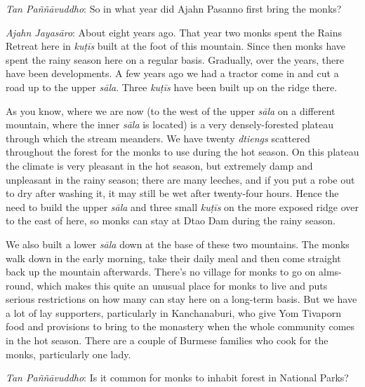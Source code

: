 \emph{Tan Paññāvuddho}: So in what year did Ajahn Pasanno first bring
the monks? 

\emph{Ajahn Jayasāro}: About eight years ago. That year two monks spent
the Rains Retreat here in \emph{kuṭīs} built at the foot of this
mountain. Since then monks have spent the rainy season here on a regular
basis. Gradually, over the years, there have been developments. A few
years ago we had a tractor come in and cut a road up to the upper \emph{sāla}.
Three \emph{kuṭīs} have been built up on the ridge there. 

As you know, where we are now (to the west of the upper \emph{sāla} on a
different mountain, where the inner \emph{sāla} is located) is a very
densely-forested plateau through which the stream meanders. We have
twenty \emph{dtiengs} scattered throughout the forest for the monks to
use during the hot season. On this plateau the climate is very pleasant
in the hot season, but extremely damp and unpleasant in the rainy
season; there are many leeches, and if you put a robe out to dry after
washing it, it may still be wet after twenty-four hours. Hence the need
to build the upper \emph{sāla} and three small \emph{kuṭīs} on the more
exposed ridge over to the east of here, so monks can stay at Dtao Dam
during the rainy season. 

We also built a lower \emph{sāla} down at the base of these two
mountains. The monks walk down in the early morning, take their daily
meal and then come straight back up the mountain afterwards. There's no
village for monks to go on alms-round, which makes this quite an unusual
place for monks to live and puts serious restrictions on how many can
stay here on a long-term basis. But we have a lot of lay supporters, 
particularly in Kanchanaburi, who give Yom Tivaporn food and provisions
to bring to the monastery when the whole community comes in the hot
season. There are a couple of Burmese families who cook for the monks,
particularly one lady.

\emph{Tan Paññāvuddho}: Is it common for monks to inhabit forest in
National Parks?

